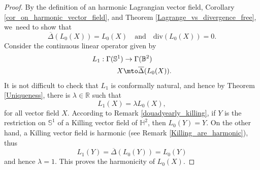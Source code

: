 \begin{proof}
By the definition of an harmonic Lagrangian vector field, Corollary \ref{cor_on_harmonic_vector_field}, and Theorem \ref{Lagrange_vs_divergence_free}, we~need to show that \begin{equation}
\overline{\Delta}(L_0(X))=L_0(X) \quad\text{and}\quad \mathrm{div}(L_0(X))=0.
\end{equation}
Consider the continuous linear operator given by
\[
\begin{aligned}
L_1:\Gamma(\mathbb{S}^1) & \to \Gamma(\mathbb{B}^2) \\
X & \mto \overline{\Delta}(L_0(X)).
\end{aligned}
\]
It is not difficult to check that $L_1$ is conformally natural, and hence by Theorem \ref{Uniqueness}, there is $\lambda\in\mathbb{R}$ such that
\begin{equation}\label{eq_harmo_L0}
L_1(X)=\lambda L_0(X),
\end{equation} for all vector field $X$.
According to Remark \ref{douadyearly_killing}, if $Y$ is the restriction on $\mathbb{S}^1$ of a Killing vector field of $\mathbb{H}^2$, then $L_0(Y)=Y$. On the other hand, a Killing vector field is harmonic (see Remark \ref{Killing_are_harmonic}), thus
\[
L_1(Y)=\overline{\Delta}(L_0(Y))=L_0(Y)
\]
and hence $\lambda=1$. This proves the harmonicity of $L_0(X)$.


\end{proof}
